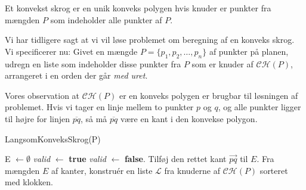 \begin{definition}
	Et konvekst skrog er en unik konveks polygen hvis knuder er punkter fra mængden $P$ som indeholder alle punkter af $P$.
\end{definition}

Vi har tidligere sagt at vi vil løse problemet om beregning af en konveks skrog. Vi specificerer nu: Givet en mængde $P = \{p_{1}, p_{2}, \ldots, p_{n}\}$ af punkter på planen, udregn en liste som indeholder disse punkter fra $P$ som er knuder af $\mathcal{CH}(P)$, arrangeret i en orden der går \textit{med uret}.

Vores observation at $\mathcal{CH}(P)$ er en konveks polygen er brugbar til løsningen af problemet. Hvis vi tager en linje mellem to punkter $p$ og $q$, og alle punkter ligger til højre for linjen $\overline{pq}$, så må $\overline{pq}$ være en kant i den konvekse polygon.

\begin{algorithm}
	\caption{\label{alg:slowconvexhull}LangsomKonveksSkrog(P)}
	\begin{algorithmic}[1]
		\STATE E $\gets \emptyset$
		\STATE \textit{valid} $\gets$ \textbf{true}
		\STATE \textit{valid} $\gets$ \textbf{false}.
		\ENDIF
		\ENDFOR
		\STATE Tilføj den rettet kant $\stackrel{\rightarrow}{pq}$ til $E$.
		\ENDIF
		\ENDFOR
		\STATE Fra mængden $E$ af kanter, konstruér en liste $\mathcal{L}$ fra knuderne af $\mathcal{CH}(P)$ sorteret med klokken.
	\end{algorithmic}
\end{algorithm}



